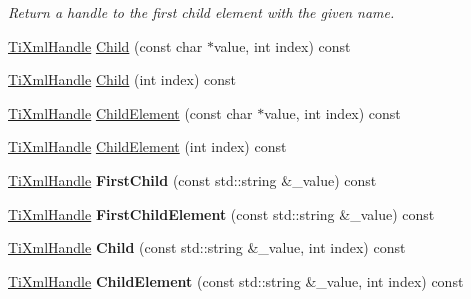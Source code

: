 \begin{DoxyCompactItemize}
\begin{DoxyCompactList}\small\item\em Return a handle to the first child element with the given name. \item\end{DoxyCompactList}\item 
\hyperlink{class_ti_xml_handle}{TiXmlHandle} \hyperlink{class_ti_xml_handle_a072492b4be1acdb0db2d03cd8f71ccc4}{Child} (const char $\ast$value, int index) const 
\item 
\hyperlink{class_ti_xml_handle}{TiXmlHandle} \hyperlink{class_ti_xml_handle_af9cf6a7d08a5da94a8924425ad0cd5ac}{Child} (int index) const 
\item 
\hyperlink{class_ti_xml_handle}{TiXmlHandle} \hyperlink{class_ti_xml_handle_a979a3f850984a176ee884e394c7eed2d}{ChildElement} (const char $\ast$value, int index) const 
\item 
\hyperlink{class_ti_xml_handle}{TiXmlHandle} \hyperlink{class_ti_xml_handle_a8786475b9d1f1518492e3a46704c7ef0}{ChildElement} (int index) const 
\item 
\hypertarget{class_ti_xml_handle_a8b10982dd39e74f3b068ca8952282d8a}{
\hyperlink{class_ti_xml_handle}{TiXmlHandle} {\bfseries FirstChild} (const std::string \&\_\-value) const }
\label{class_ti_xml_handle_a8b10982dd39e74f3b068ca8952282d8a}

\item 
\hypertarget{class_ti_xml_handle_a743f1e9cc18b5658c158ed5c0c165354}{
\hyperlink{class_ti_xml_handle}{TiXmlHandle} {\bfseries FirstChildElement} (const std::string \&\_\-value) const }
\label{class_ti_xml_handle_a743f1e9cc18b5658c158ed5c0c165354}

\item 
\hypertarget{class_ti_xml_handle_a5c4617db96789e9a5581dd5c12cdd287}{
\hyperlink{class_ti_xml_handle}{TiXmlHandle} {\bfseries Child} (const std::string \&\_\-value, int index) const }
\label{class_ti_xml_handle_a5c4617db96789e9a5581dd5c12cdd287}

\item 
\hypertarget{class_ti_xml_handle_a2e5f7758156e6b29a8e7a423eca2cf5b}{
\hyperlink{class_ti_xml_handle}{TiXmlHandle} {\bfseries ChildElement} (const std::string \&\_\-value, int index) const }
\label{class_ti_xml_handle_a2e5f7758156e6b29a8e7a423eca2cf5b}


\end{DoxyCompactItemize}
